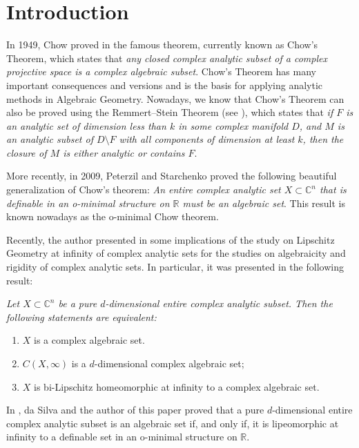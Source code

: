 \documentclass[a4paper,11pt]{amsart}
\newcommand{\C}{\mathbb C}
\newcommand{\R}{\mathbb R}
\begin{document}
\maketitle


\section{Introduction}

In 1949, Chow proved in \cite{Chow:1949} the famous theorem, currently known as Chow's Theorem, which states that {\it any closed complex analytic subset of a complex projective space is a complex algebraic subset}. Chow's Theorem has many important consequences and versions and is the basis for applying analytic methods in Algebraic Geometry. 
Nowadays, we know that Chow's Theorem can also be proved using the Remmert–Stein Theorem (see \cite{RemmertS:1953}), which states that {\it if $F$ is an analytic set of dimension less than $k$ in some complex manifold $D$, and $M$ is an analytic subset of $D \setminus F$ with all components of dimension at least $k$, then the closure of $M$ is either analytic or contains $F$}.

More recently, in 2009, Peterzil and Starchenko \cite{PeterzilS:2009} proved the following beautiful generalization of Chow's
theorem: {\it An entire complex analytic set $X\subset \mathbb{C}^n$ that is definable in an o-minimal structure on $\mathbb{R}$ must be an algebraic set}. This result is known nowadays as the o-minimal Chow theorem.


 
Recently, the author presented in \cite{Sampaio:2023} some implications of the study on Lipschitz Geometry at infinity of complex analytic sets for the studies on algebraicity and rigidity of complex analytic sets.
In particular, it was presented in \cite{Sampaio:2023} the following result: {\it Let $X\subset\C^n$ be a pure $d$-dimensional entire complex analytic subset. Then the following statements are equivalent:
\begin{enumerate}
 \item [(1)] $X$ is a complex algebraic set.
 \item [(2)] $C(X,\infty)$ is a $d$-dimensional complex algebraic set;
 \item [(3)] $X$ is bi-Lipschitz homeomorphic at infinity to a complex algebraic set.
\end{enumerate}}

In \cite{SampaioS:2024}, da Silva and the author of this paper proved that a pure $d$-dimensional entire complex analytic subset is an algebraic set if, and only if, it is lipeomorphic at infinity to a definable set in an o-minimal structure on $\R$.
\end{document}
